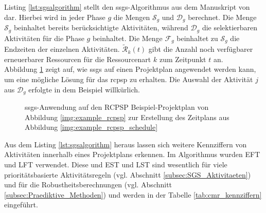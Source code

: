 Listing \ref{lst:sgsalgorithm} stellt den \ac{ssgs}-Algorithmus aus dem Manuskript von \cite{kolisch_heuristic_1998} dar. Hierbei wird in jeder Phase $g$ die Mengen $\mathcal{S}_g$ und $\mathcal{D}_g$ berechnet. Die Menge $\mathcal{S}_g$ beinhaltet bereits berücksichtigte Aktivitäten, während $\mathcal{D}_g$ die selektierbaren Aktivitäten für die Phase $g$ beinhaltet. Die Menge $\mathcal{F}_g$ beinhaltet zu $\mathcal{S}_g$ die Endzeiten der einzelnen Aktivitäten. $\tilde{\mathcal{R}}_k(t)$ gibt die Anzahl noch verfügbarer erneuerbarer Ressourcen für die Ressourcenart $k$ zum Zeitpunkt $t$ an. \cite[vgl.][S. 3 f.]{kolisch_heuristic_1998}\\

Abbildung \ref{img:example_ssgs_application} zeigt auf, wie \ac{ssgs} auf einen Projektplan angewendet werden kann, um eine mögliche Lösung für das \ac{rcpsp} zu erhalten. Die Auswahl der Aktivität $j$ aus $\mathcal{D}_g$ erfolgte in dem Beispiel willkürlich. 

\begin{figure}[H]
    \centering
    \noindent{}
    \caption{\acs{ssgs}-Anwendung auf den RCPSP Beispiel-Projektplan von Abbildung \ref{img:example_rcpsp} zur Erstellung des Zeitplans aus Abbildung \ref{img:example_rcpsp_schedule}}
    \label{img:example_ssgs_application}
\end{figure}

Aus dem Listing \ref{lst:sgsalgorithm} heraus lassen sich weitere Kennziffern von Aktivitäten innerhalb eines Projektplans erkennen. Im Algorithmus wurden \ac{EFT} und \ac{LFT} verwendet. Diese und \ac{EST} und \ac{LST} sind wesentlich für viele prioritätsbasierte Aktivitätsregeln (vgl. Abschnitt \ref{subsec:SGS_Aktivitaeten}) und für die Robustheitsberechnungen (vgl. Abschnitt \ref{subsec:Praediktive_Methoden}) und werden in der Tabelle \ref{tab:cmr_kennziffern} eingeführt. \\

